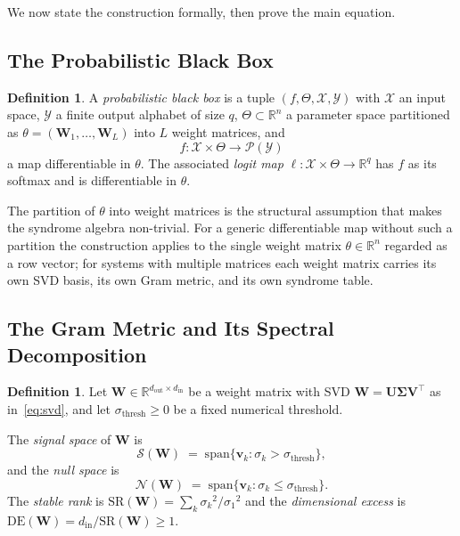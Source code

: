 \documentclass[11pt,a4paper]{article}
\theoremstyle{definition}
\newtheorem{definition}[theorem]{Definition}
\newcommand{\Wm}{\mathbf{W}}
\newcommand{\Um}{\mathbf{U}}
\newcommand{\Vm}{\mathbf{V}}
\newcommand{\Sig}{\boldsymbol{\Sigma}}
\newcommand{\vk}[1][]{\mathbf{v}_{#1}}
\newcommand{\Rbb}{\mathbb{R}}
\newcommand{\dimin}{d_{\mathrm{in}}}
\newcommand{\dimout}{d_{\mathrm{out}}}
\begin{document}
We now state the construction formally, then prove the main equation.

\subsection{The Probabilistic Black Box}
\label{sec:bb}
\begin{defbox}
\begin{definition}
\label{def:bb}
A \emph{probabilistic black box} is a tuple $(f, \Theta, \mathcal{X}, \mathcal{Y})$ with $\mathcal{X}$ an input space, $\mathcal{Y}$ a finite output alphabet of size $q$, $\Theta \subset \Rbb^n$ a parameter space partitioned as $\theta = (\Wm_1, \ldots,\Wm_L)$ into $L$ weight matrices, and
\[
  f: \mathcal{X}\times\Theta \to \mathcal{P}(\mathcal{Y})
\]
a map differentiable in $\theta$. The associated \emph{logit map} $\ell: \mathcal{X}\times\Theta \to \Rbb^q$ has $f$ as its softmax and is differentiable in $\theta$.
\end{definition}
\end{defbox}

The partition of $\theta$ into weight matrices is the structural assumption that makes the syndrome algebra non-trivial. For a generic differentiable map without such a partition the construction applies to the single weight matrix $\theta\in\Rbb^n$ regarded as a row vector; for systems with multiple matrices each weight matrix carries its own SVD basis, its own Gram metric, and its own syndrome table.

\subsection{The Gram Metric and Its Spectral Decomposition}
\label{sec:gram_metric}

\begin{defbox}
\begin{definition}
\label{def:signal_null}
Let $\Wm\in\Rbb^{\dimout\times\dimin}$ be a weight matrix with SVD $\Wm = \Um\Sig\Vm^\top$ as in~\eqref{eq:svd}, and let $\sigma_{\mathrm{thresh}}\geq 0$ be a fixed numerical threshold.

The \emph{signal space} of $\Wm$ is
\[
  \mathcal{S}(\Wm) \;=\; \mathrm{span}\{\vk[k] : \sigma_k > \sigma_{\mathrm{thresh}}\},
\]
and the \emph{null space} is
\[
  \mathcal{N}(\Wm) \;=\; \mathrm{span}\{\vk[k] : \sigma_k \leq \sigma_{\mathrm{thresh}}\}.
\]
The \emph{stable rank} is
$\mathrm{SR}(\Wm) = \sum_k \sigma_k{}^2 / \sigma_1{}^2$ and the
\emph{dimensional excess} is
$\mathrm{DE}(\Wm) = \dimin / \mathrm{SR}(\Wm) \geq 1$.
\end{definition}
\end{defbox}
\end{document}
